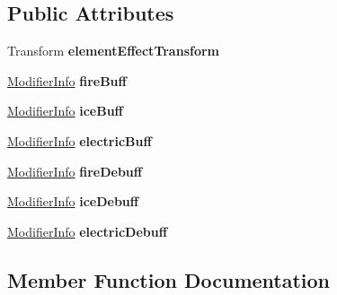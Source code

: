 \subsection*{Public Attributes}
\begin{DoxyCompactItemize}
\item 
\hypertarget{class_elemental_modifiers_ad48fbf5657b6a6d0fae06b10497212c4}{}\label{class_elemental_modifiers_ad48fbf5657b6a6d0fae06b10497212c4} 
Transform {\bfseries element\+Effect\+Transform}
\item 
\hypertarget{class_elemental_modifiers_ac87bd70029c963f71b04516fedd23b4a}{}\label{class_elemental_modifiers_ac87bd70029c963f71b04516fedd23b4a} 
\hyperlink{struct_modifier_info}{Modifier\+Info} {\bfseries fire\+Buff}
\item 
\hypertarget{class_elemental_modifiers_af158c9afd0bbfa5537e4893f5cddefe9}{}\label{class_elemental_modifiers_af158c9afd0bbfa5537e4893f5cddefe9} 
\hyperlink{struct_modifier_info}{Modifier\+Info} {\bfseries ice\+Buff}
\item 
\hypertarget{class_elemental_modifiers_ace9cffa8f84790106fb4821d83da694c}{}\label{class_elemental_modifiers_ace9cffa8f84790106fb4821d83da694c} 
\hyperlink{struct_modifier_info}{Modifier\+Info} {\bfseries electric\+Buff}
\item 
\hypertarget{class_elemental_modifiers_ad4cbb0d8d69ce9d20c11a84c15815ae7}{}\label{class_elemental_modifiers_ad4cbb0d8d69ce9d20c11a84c15815ae7} 
\hyperlink{struct_modifier_info}{Modifier\+Info} {\bfseries fire\+Debuff}
\item 
\hypertarget{class_elemental_modifiers_aec167f8962343d0441bfcf57d6af4db7}{}\label{class_elemental_modifiers_aec167f8962343d0441bfcf57d6af4db7} 
\hyperlink{struct_modifier_info}{Modifier\+Info} {\bfseries ice\+Debuff}
\item 
\hypertarget{class_elemental_modifiers_aeccd0c8c8e7c6467a6d344ebb9dac739}{}\label{class_elemental_modifiers_aeccd0c8c8e7c6467a6d344ebb9dac739} 
\hyperlink{struct_modifier_info}{Modifier\+Info} {\bfseries electric\+Debuff}
\end{DoxyCompactItemize}


\subsection{Member Function Documentation}
\hypertarget{class_elemental_modifiers_ab78c8c14e739e2b9e2a3478013361901}{}\label{class_elemental_modifiers_ab78c8c14e739e2b9e2a3478013361901} 
